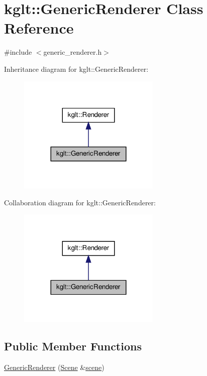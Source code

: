 \hypertarget{classkglt_1_1_generic_renderer}{\section{kglt\-:\-:Generic\-Renderer Class Reference}
\label{classkglt_1_1_generic_renderer}
}


{\ttfamily \#include $<$generic\-\_\-renderer.\-h$>$}



Inheritance diagram for kglt\-:\-:Generic\-Renderer\-:\nopagebreak
\begin{figure}[H]
\begin{center}
\leavevmode
\includegraphics[width=192pt]{classkglt_1_1_generic_renderer__inherit__graph}
\end{center}
\end{figure}


Collaboration diagram for kglt\-:\-:Generic\-Renderer\-:\nopagebreak
\begin{figure}[H]
\begin{center}
\leavevmode
\includegraphics[width=192pt]{classkglt_1_1_generic_renderer__coll__graph}
\end{center}
\end{figure}
\subsection*{Public Member Functions}
\begin{DoxyCompactItemize}
\item 
\hyperlink{classkglt_1_1_generic_renderer_a03853c0e00e122200f91fc510c22f0a1}{Generic\-Renderer} (\hyperlink{classkglt_1_1_scene}{Scene} \&\hyperlink{classkglt_1_1_renderer_a53eeb595f09f1332539a9301a5c0d988}{scene})
\end{DoxyCompactItemize}
